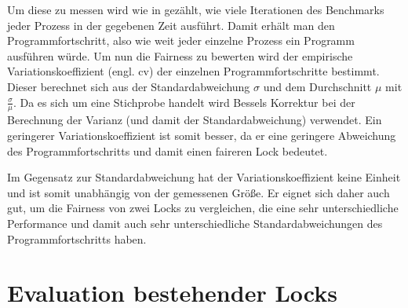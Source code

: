 Um diese zu messen wird wie in \cite{Cohort-Lock} gezählt,
wie viele Iterationen des Benchmarks jeder Prozess in der gegebenen Zeit ausführt.
Damit erhält man den Programmfortschritt,
also wie weit jeder einzelne Prozess ein Programm ausführen würde.
Um nun die Fairness zu bewerten wird der empirische Variationskoeffizient (engl. \gls{cv}) der einzelnen Programmfortschritte bestimmt.
Dieser berechnet sich aus der Standardabweichung $\sigma$ und dem Durchschnitt $\mu$ mit $\frac{\sigma}{\mu}$.
Da es sich um eine Stichprobe handelt wird Bessels Korrektur \cite{bessels_correction} bei der Berechnung der Varianz (und damit der Standardabweichung) verwendet.
Ein geringerer Variationskoeffizient ist somit besser,
da er eine geringere Abweichung des Programmfortschritts
und damit einen faireren Lock bedeutet.

Im Gegensatz zur Standardabweichung hat der Variationskoeffizient keine Einheit
und ist somit unabhängig von der gemessenen Größe.
Er eignet sich daher auch gut,
um die Fairness von zwei Locks zu vergleichen,
die eine sehr unterschiedliche Performance
und damit auch sehr unterschiedliche Standardabweichungen des Programmfortschritts haben.


\section{Evaluation bestehender Locks}


